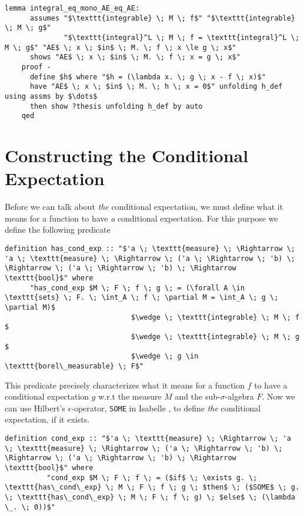 \begin{isacorollary}
{\small
	\begin{lstlisting}[style=isabelle]
	lemma integral_eq_mono_AE_eq_AE:
	  assumes "$\texttt{integrable} \; M \; f$" "$\texttt{integrable} \; M \; g$" 
			  "$\texttt{integral}^L \; M \; f = \texttt{integral}^L \; M \; g$" "AE$ \; x \; $in$ \; M. \; f \; x \le g \; x$" 
	  shows "AE$ \; x \; $in$ \; M. \; f \; x = g \; x$"
	proof -
	  define $h$ where "$h = (\lambda x. \; g \; x - f \; x)$"
	  have "AE$ \; x \; $in$ \; M. \; h \; x = 0$" unfolding h_def using assms by $\dots$
	  then show ?thesis unfolding h_def by auto
	qed
	\end{lstlisting}
}
\end{isacorollary}

\section{Constructing the Conditional Expectation}

Before we can talk about \textit{the} conditional expectation, we must define what it means for a function to have \textit{a} conditional expectation. For this purpose we define the following predicate

\begin{isadefinition}
{\small
\begin{lstlisting}[style=isabelle]
	definition has_cond_exp :: "$'a \; \texttt{measure} \; \Rightarrow \; 'a \; \texttt{measure} \; \Rightarrow \; ('a \; \Rightarrow \; 'b) \; \Rightarrow \; ('a \; \Rightarrow \; 'b) \; \Rightarrow \texttt{bool}$" where 
	  "has_cond_exp $M \; F \; f \; g \; = (\forall A \in \texttt{sets} \; F. \; \int_A \; f \; \partial M = \int_A \; g \; \partial M)$
							  $\wedge \; \texttt{integrable} \; M \; f $
							  $\wedge \; \texttt{integrable} \; M \; g $
							  $\wedge \; g \in \texttt{borel\_measurable} \; F$"
\end{lstlisting}
}
\end{isadefinition}


This predicate precisely characterizes what it means for a function $f$ to have a conditional expectation $g$ w.r.t the measure $M$ and the sub-$\sigma$-algebra $F$. Now we can use Hilbert's $\epsilon$-operator, \lstinline[language=isabelle]{SOME} in Isabelle \cite{Nipkow-Paulson-Wenzel:2002}, to define \textit{the} conditional expectation, if it exists.


\begin{isadefinition}
{\small
	\begin{lstlisting}[style=isabelle]
		definition cond_exp :: "$'a \; \texttt{measure} \; \Rightarrow \; 'a \; \texttt{measure} \; \Rightarrow \; ('a \; \Rightarrow \; 'b) \; \Rightarrow \; ('a \; \Rightarrow \; 'b) \; \Rightarrow \texttt{bool}$" where 
		  "cond_exp $M \; F \; f \; = ($if$ \; \exists g. \; \texttt{has\_cond\_exp} \; M \; F \; f \; g \; $then$ \; ($SOME$ \; g. \; \texttt{has\_cond\_exp} \; M \; F \; f \; g) \; $else$ \; (\lambda \_. \; 0))$"
	\end{lstlisting}
}
\end{isadefinition}

